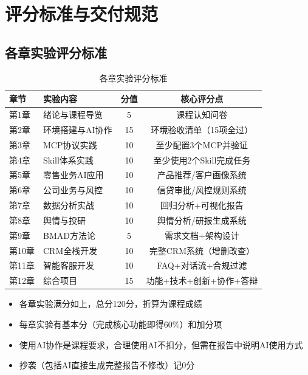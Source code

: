
\chapter{评分标准与交付规范}

\section{各章实验评分标准}

\begin{table}[H]
\centering
\small
\begin{tabular}{llcc}
\toprule
\textbf{章节} & \textbf{实验内容} & \textbf{分值} & \textbf{核心评分点} \\
\midrule
第1章 & 绪论与课程导览 & 5 & 课程认知问卷 \\
第2章 & 环境搭建与AI协作 & 15 & 环境验收清单（15项全过） \\
第3章 & MCP协议实践 & 10 & 至少配置3个MCP并验证 \\
第4章 & Skill体系实践 & 10 & 至少使用2个Skill完成任务 \\
第5章 & 零售业务AI应用 & 10 & 产品推荐/客户画像系统 \\
第6章 & 公司业务与风控 & 10 & 信贷审批/风控规则系统 \\
第7章 & 数据分析实战 & 10 & 回归分析+可视化报告 \\
第8章 & 舆情与投研 & 10 & 舆情分析/研报生成系统 \\
第9章 & BMAD方法论 & 5 & 需求文档+架构设计 \\
第10章 & CRM全栈开发 & 10 & 完整CRM系统（增删改查） \\
第11章 & 智能客服开发 & 10 & FAQ+对话流+合规过滤 \\
第12章 & 综合项目 & 15 & 功能+技术+创新+协作+答辩 \\
\bottomrule
\end{tabular}
\caption{各章实验评分标准}
\end{table}

\begin{notebox}[评分说明]
\begin{itemize}[leftmargin=1em]
  \item 各章实验满分如上，总分120分，折算为课程成绩
  \item 每章实验有基本分（完成核心功能即得60\%）和加分项
  \item 使用AI协作是课程要求，合理使用AI不扣分，但需在报告中说明AI使用方式
  \item 抄袭（包括AI直接生成完整报告不修改）记0分
\end{itemize}
\end{notebox}

